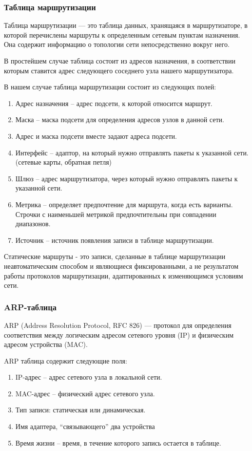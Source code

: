 \documentclass[12pt,onecolumn]{article}
\begin{document}
\subsubsection{Таблица маршрутизации}
\label{sec:routing}
Таблица маршрутизации — это таблица данных, хранящаяся в маршрутизаторе, в которой перечислены маршруты к определенным сетевым пунктам назначения. Она содержит информацию о топологии сети непосредственно вокруг него.

В простейшем случае таблица состоит из адресов назначения, в соответствии которым ставится адрес следующего соседнего узла нашего маршрутизатора.

В нашем случае таблица маршрутизации состоит из следующих полей:
\begin{enumerate}
  \item Адрес назначения -- адрес подсети, к которой относится маршрут.
  \item Маска -- маска подсети для определения адресов узлов в данной сети.
  \item Адрес и маска подсети вместе задают адреса подсети.
  \item Интерфейс -- адаптор, на который нужно отправлять пакеты к указанной сети. (сетевые карты, обратная петля)
  \item Шлюз -- адрес маршрутизатора, через который нужно отправлять пакеты к указанной сети.
  \item Метрика --  определяет предпочтение для маршрута, когда есть варианты. Строчки с наименьшей метрикой предпочтительны при совпадении диапазонов.
  \item Источник -- источник появления записи в таблице маршрутизации.
\end{enumerate}

Статические маршруты - это записи, сделанные в таблице маршрутизации неавтоматическим способом и являющиеся фиксированными, а не результатом работы протоколов маршрутизации, адаптированных к изменяющимся условиям сети.
\subsubsection{ARP-таблица}
\label{sec:arp}
ARP (Address Resolution Protocol, RFC 826) — протокол для определения соответствия между логическим адресом сетевого уровня (IP) и физическим адресом устройства (MAC).

ARP таблица содержит следующие поля:
\begin{enumerate}
  \item IP-адрес -- адрес сетевого узла в локальной сети.
  \item MAC-адрес --  физический адрес сетевого узла.
  \item Тип записи: статическая или динамическая.
  \item Имя адаптера, “связывающего” два устройства 
  \item Время жизни -- время, в течение которого запись остается в таблице.
\end{enumerate}
\end{document}
